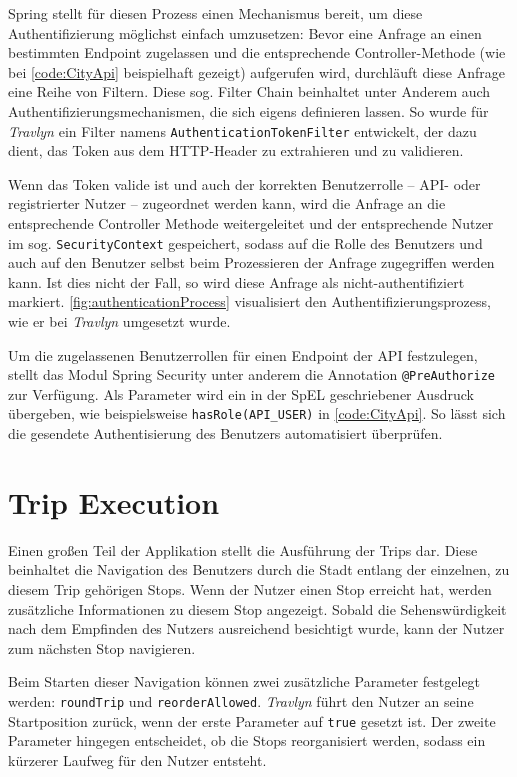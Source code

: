 		Spring stellt für diesen Prozess einen Mechanismus bereit, um diese Authentifizierung möglichst einfach umzusetzen: Bevor eine Anfrage an einen bestimmten Endpoint zugelassen und die entsprechende Controller-Methode (wie bei \autoref{code:CityApi} beispielhaft gezeigt) aufgerufen wird, durchläuft diese Anfrage eine Reihe von Filtern. Diese sog. Filter Chain beinhaltet unter Anderem auch Authentifizierungsmechanismen, die sich eigens definieren lassen. So wurde für \textit{Travlyn} ein Filter namens \lstinline|AuthenticationTokenFilter| entwickelt, der dazu dient, das Token aus dem \acs{HTTP}-Header zu extrahieren und zu validieren. 
		
		Wenn das Token valide ist und auch der korrekten Benutzerrolle -- \acs{API}- oder registrierter Nutzer -- zugeordnet werden kann, wird die Anfrage an die entsprechende Controller Methode weitergeleitet und der entsprechende Nutzer im sog. \lstinline|SecurityContext| gespeichert, sodass auf die Rolle des Benutzers und auch auf den Benutzer selbst beim Prozessieren der Anfrage zugegriffen werden kann. Ist dies nicht der Fall, so wird diese Anfrage als nicht-authentifiziert markiert. \autoref{fig:authenticationProcess} visualisiert den Authentifizierungsprozess, wie er bei \textit{Travlyn} umgesetzt wurde.
		
		Um die zugelassenen Benutzerrollen für einen Endpoint der \acs{API} festzulegen, stellt das Modul Spring Security unter anderem die Annotation \lstinline|@PreAuthorize| zur Verfügung. Als Parameter wird ein in der \ac{SpEL} geschriebener Ausdruck übergeben, wie beispielsweise \lstinline|hasRole(API_USER)| in \autoref{code:CityApi}. So lässt sich die gesendete Authentisierung des Benutzers automatisiert überprüfen.
		
	\section{Trip Execution} 
	
		Einen großen Teil der Applikation stellt die Ausführung der Trips dar. Diese beinhaltet die Navigation des Benutzers durch die Stadt entlang der einzelnen, zu diesem Trip gehörigen Stops. Wenn der Nutzer einen Stop erreicht hat, werden zusätzliche Informationen zu diesem Stop angezeigt. Sobald die Sehenswürdigkeit nach dem Empfinden des Nutzers ausreichend besichtigt wurde, kann der Nutzer zum nächsten Stop navigieren. 
		
		Beim Starten dieser Navigation können zwei zusätzliche Parameter festgelegt werden: \lstinline|roundTrip| und \lstinline|reorderAllowed|. \textit{Travlyn} führt den Nutzer an seine Startposition zurück, wenn der erste Parameter auf \lstinline|true| gesetzt ist. Der zweite Parameter hingegen entscheidet, ob die Stops reorganisiert werden, sodass ein kürzerer Laufweg für den Nutzer entsteht. 
		

